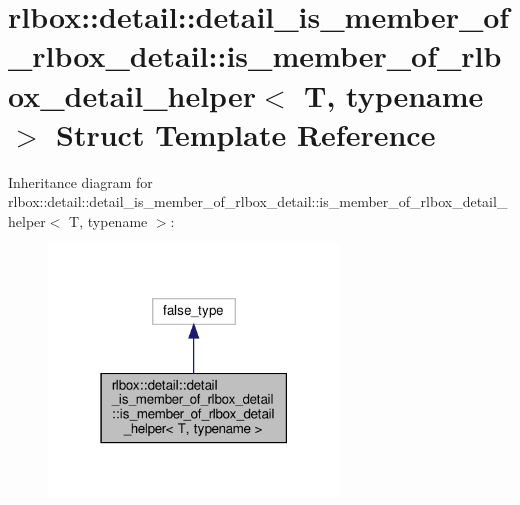 \hypertarget{structrlbox_1_1detail_1_1detail__is__member__of__rlbox__detail_1_1is__member__of__rlbox__detail__helper}{}\section{rlbox\+:\+:detail\+:\+:detail\+\_\+is\+\_\+member\+\_\+of\+\_\+rlbox\+\_\+detail\+:\+:is\+\_\+member\+\_\+of\+\_\+rlbox\+\_\+detail\+\_\+helper$<$ T, typename $>$ Struct Template Reference}
\label{structrlbox_1_1detail_1_1detail__is__member__of__rlbox__detail_1_1is__member__of__rlbox__detail__helper}


Inheritance diagram for rlbox\+:\+:detail\+:\+:detail\+\_\+is\+\_\+member\+\_\+of\+\_\+rlbox\+\_\+detail\+:\+:is\+\_\+member\+\_\+of\+\_\+rlbox\+\_\+detail\+\_\+helper$<$ T, typename $>$\+:\nopagebreak
\begin{figure}[H]
\begin{center}
\leavevmode
\includegraphics[width=219pt]{structrlbox_1_1detail_1_1detail__is__member__of__rlbox__detail_1_1is__member__of__rlbox__detail__helper__inherit__graph}
\end{center}
\end{figure}



